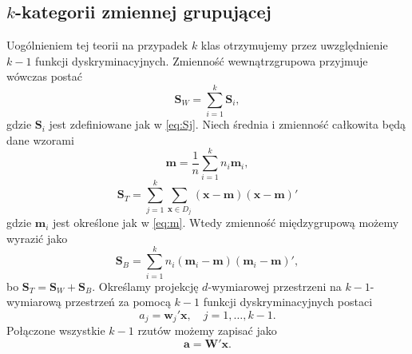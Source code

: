 \documentclass[
]{book}
\theoremstyle{plain}
\theoremstyle{definition}
\theoremstyle{definition}
\theoremstyle{definition}
\theoremstyle{definition}
\theoremstyle{remark}
\begin{document}
\hypertarget{k-kategorii-zmiennej-grupujux105cej}{%
\subsection{\texorpdfstring{\(k\)-kategorii zmiennej grupującej}{k-kategorii zmiennej grupującej}}\label{k-kategorii-zmiennej-grupujux105cej}}

Uogólnieniem tej teorii na przypadek \(k\) klas otrzymujemy przez uwzględnienie \(k-1\) funkcji dyskryminacyjnych. Zmienność wewnątrzgrupowa przyjmuje wówczas postać
\begin{equation}
    \boldsymbol{S}_W=\sum_{i=1}^k\boldsymbol{S}_i,
\end{equation}
gdzie \(\boldsymbol{S}_i\) jest zdefiniowane jak w \eqref{eq:Sj}.
Niech średnia i zmienność całkowita będą dane wzorami
\begin{equation}
    \boldsymbol{m}=\frac{1}{n}\sum_{i=1}^kn_i\boldsymbol{m}_i,
\end{equation}
\begin{equation}
    \boldsymbol{S}_T=\sum_{j=1}^k\sum_{\boldsymbol{x}\in D_j}(\boldsymbol{x}-\boldsymbol{m})(\boldsymbol{x}-\boldsymbol{m})'
\end{equation}
gdzie \(\boldsymbol{m}_i\) jest określone jak w \eqref{eq:m}. Wtedy zmienność międzygrupową możemy wyrazić jako
\begin{equation}
    \boldsymbol{S}_B=\sum_{i=1}^kn_i(\boldsymbol{m}_i-\boldsymbol{m})(\boldsymbol{m}_i-\boldsymbol{m})',
\end{equation}
bo \(\boldsymbol{S}_T=\boldsymbol{S}_W+\boldsymbol{S}_B.\)
Określamy projekcję \(d\)-wymiarowej przestrzeni na \(k-1\)-wymiarową przestrzeń za pomocą \(k-1\) funkcji dyskryminacyjnych postaci
\begin{equation}
    a_j=\boldsymbol{w}_j'\boldsymbol{x}, \quad j=1,\ldots,k-1.
\end{equation}
Połączone wszystkie \(k-1\) rzutów możemy zapisać jako
\begin{equation}
    \boldsymbol{a}=\boldsymbol{W}'\boldsymbol{x}.
\end{equation}
\end{document}
